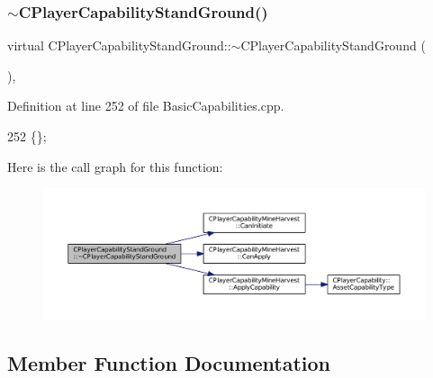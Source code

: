 \subsubsection{\texorpdfstring{$\sim$\+C\+Player\+Capability\+Stand\+Ground()}{~CPlayerCapabilityStandGround()}}
{\footnotesize\ttfamily virtual C\+Player\+Capability\+Stand\+Ground\+::$\sim$\+C\+Player\+Capability\+Stand\+Ground (\begin{DoxyParamCaption}{ }\end{DoxyParamCaption})\hspace{0.3cm}{\ttfamily [inline]}, {\ttfamily [virtual]}}



Definition at line 252 of file Basic\+Capabilities.\+cpp.


\begin{DoxyCode}
252 \{\};
\end{DoxyCode}
Here is the call graph for this function\+:\nopagebreak
\begin{figure}[H]
\begin{center}
\leavevmode
\includegraphics[width=350pt]{classCPlayerCapabilityStandGround_aa09aba607953849ece673feeb27ef6fd_cgraph}
\end{center}
\end{figure}


\subsection{Member Function Documentation}
\hypertarget{classCPlayerCapabilityStandGround_a3e1beee9125b2a940f803c3234866bb2}{}\label{classCPlayerCapabilityStandGround_a3e1beee9125b2a940f803c3234866bb2} 
